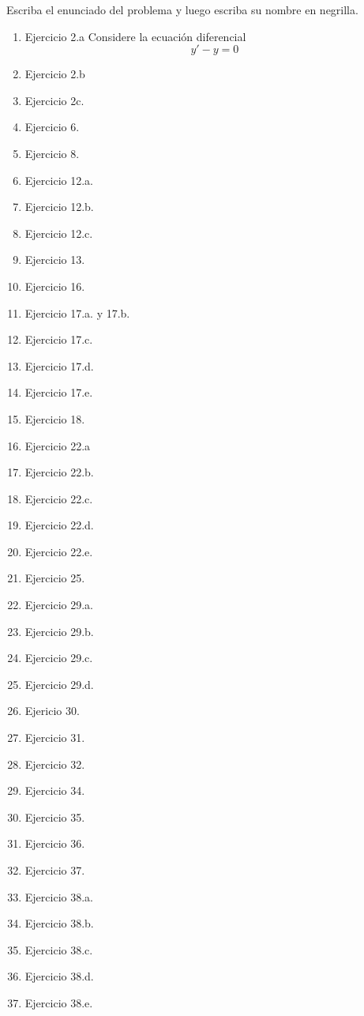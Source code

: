 
Escriba el enunciado del problema y luego escriba su nombre en negrilla. 

\begin{enumerate}
    \item Ejercicio 2.a Considere la ecuación diferencial $$y' -y= 0$$ 
    \item Ejercicio 2.b
    \item Ejercicio 2c.
    \item Ejercicio 6.
    \item Ejercicio 8.
    \item Ejercicio 12.a.
    \item Ejercicio 12.b.
    \item Ejercicio 12.c.
    \item Ejercicio 13.
    \item Ejercicio 16.
    \item Ejercicio 17.a. y 17.b.
    \item Ejercicio 17.c.
    \item Ejercicio 17.d.
    \item Ejercicio 17.e.
    \item Ejercicio 18.
    \item Ejercicio 22.a 
    \item Ejercicio 22.b.
    \item Ejercicio 22.c.
    \item Ejercicio 22.d.
    \item Ejercicio 22.e.
    \item Ejercicio 25.
    \item Ejercicio 29.a.
    \item Ejercicio 29.b.
    \item Ejercicio 29.c.
    \item Ejercicio 29.d.
    \item Ejericio 30.
    \item Ejercicio 31.
    \item Ejercicio 32.
    \item Ejercicio 34.
    \item Ejercicio 35.
    \item Ejercicio 36.
    \item Ejercicio 37.
    \item Ejercicio 38.a.
    \item Ejercicio 38.b.
    \item Ejercicio 38.c.
    \item Ejercicio 38.d.
    \item Ejercicio 38.e.

\end{enumerate}
